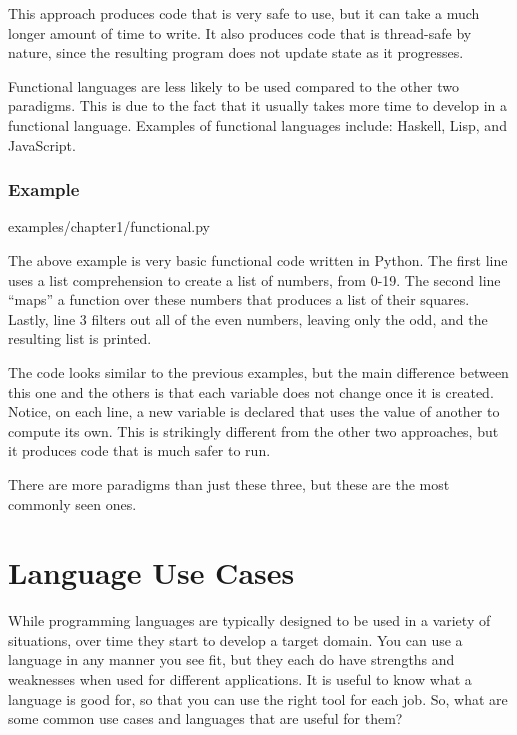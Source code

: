 \documentclass[12pt, oneside, a4paper]{book}
\begin{document}
         This approach produces code that is very safe to use, but it can take a much longer amount of time to write.
         It also produces code that is thread-safe by nature, since the resulting program does not update state as it progresses.

         Functional languages are less likely to be used compared to the other two paradigms.
         This is due to the fact that it usually takes more time to develop in a functional language.
         Examples of functional languages include: Haskell, Lisp, and JavaScript\footnotemark.


         \subsubsection{Example}
         
         {examples/chapter1/functional.py}

         The above example is very basic functional code written in Python.
         The first line uses a list comprehension to create a list of numbers, from 0-19.
         The second line ``maps'' a function over these numbers that produces a list of their squares.
         Lastly, line 3 filters out all of the even numbers, leaving only the odd, and the resulting list is printed.

         The code looks similar to the previous examples, but the main difference between this one and the others is that each variable does not change once it is created.
         Notice, on each line, a new variable is declared that uses the value of another to compute its own.
         This is strikingly different from the other two approaches, but it produces code that is much safer to run.

         There are more paradigms than just these three, but these are the most commonly seen ones.

         \section{Language Use Cases}
         While programming languages are typically designed to be used in a variety of situations, over time they start to develop a target domain.
         You can use a language in any manner you see fit, but they each do have strengths and weaknesses when used for different applications.
         It is useful to know what a language is good for, so that you can use the right tool for each job.
         So, what are some common use cases and languages that are useful for them?
\end{document}

